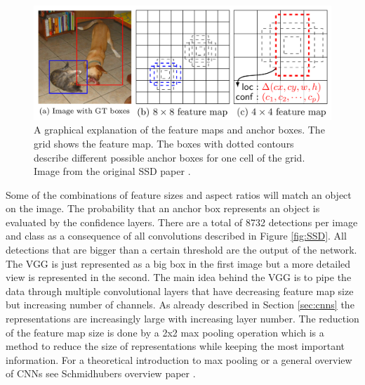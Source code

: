 \begin{figure}[!htb]
	\centering
	\includegraphics[width=\textwidth]{images/SSD_feature_maps}
	\caption{A graphical explanation of the feature maps and anchor boxes. The grid shows the feature map. The boxes with dotted contours describe different possible anchor boxes for one cell of the grid. Image from the original SSD paper \cite{SSD}.}
	\label{fig:SSD_feature_maps}
\end{figure}

Some of the combinations of feature sizes and aspect ratios will match an object on the image. The probability that an anchor box represents an object is evaluated by the confidence layers. There are a total of 8732 detections per image and class as a consequence of all convolutions described in Figure \ref{fig:SSD}. All detections that are bigger than a certain threshold are the output of the network. The VGG is just represented as a big box in the first image but a more detailed view is represented in the second. The main idea behind the VGG is to pipe the data through multiple convolutional layers that have decreasing feature map size but increasing number of channels. As already described in Section \ref{sec:cnns} the representations are increasingly large with increasing layer number. The reduction of the feature map size is done by a 2x2 max pooling operation which is a method to reduce the size of representations while keeping the most important information. For a theoretical introduction to max pooling or a general overview of CNNs see Schmidhubers overview paper \cite{SchmidhuberOverview}. 

